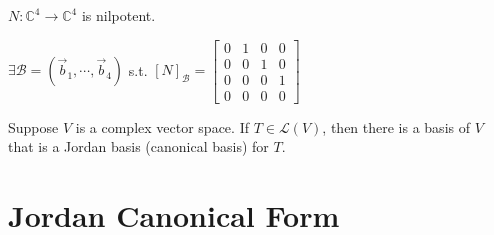 \documentclass[11pt,fleqn]{book} %
\begin{document}
\begin{example}
    $N: \mathbb{C}^4 \to \mathbb{C}^4$ is nilpotent.

    $\exists \mathcal{B} = (\vec{b}_1, \cdots, \vec{b}_4)$ s.t. $[N]_\mathcal{B} = \begin{bmatrix} 0 &1 &0 &0 \\ 0 &0 &1 &0 \\ 0 &0 &0 &1 \\ 0 &0 &0 &0 \end{bmatrix}$
\end{example}

\begin{theorem}
    Suppose $V$ is a complex vector space. If $T \in \mathcal{L}(V)$, then there is a basis of $V$ that is a Jordan basis (canonical basis) for $T$.
\end{theorem}

\section{Jordan Canonical Form}
\end{document}
